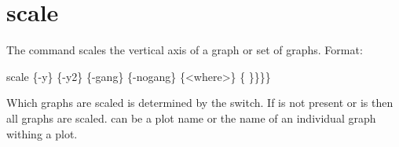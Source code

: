 \section{scale}
\label{s:scale}

The  command scales the vertical axis of a graph or set of graphs.  Format:
\begin{example}
  scale \{-y\} \{-y2\} \{-gang\} \{-nogang\} \{<where>\} \{<value1> \}<value2>\}\}\}
\end{example}

Which graphs are scaled is determined by the  switch. If  is not
present or  is  then all graphs are scaled.  can be a plot
name or the name of an individual graph withing a plot.

\vskip 10pt 

